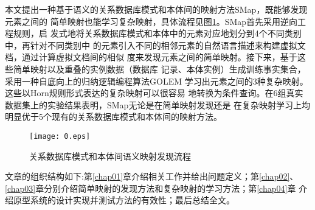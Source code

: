 本文提出一种基于语义的关系数据库模式和本体间的映射方法SMap，既能够发现元素之间的
简单映射也能学习复杂映射，具体流程见图\ref{fig:0}。SMap首先采用逆向工程规则，启
发式地将关系数据库模式和本体中的元素对应地划分到4个不同类别中，再针对不同类别中
的元素引入不同的相邻元素的自然语言描述来构建虚拟文档，通过计算虚拟文档间的相似
度来发现元素之间的简单映射。接下来，基于这些简单映射以及重叠的实例数据（数据库
记录、本体实例）生成训练事实集合，采用一种自底向上的归纳逻辑编程算法GOLEM
\cite{8}学习出元素之间的3种复杂映射。这些以Horn规则形式表达的复杂映射可以很容易
地转换为条件查询。在6组真实数据集上的实验结果表明，SMap无论是在简单映射发现还是
在复杂映射学习上均明显优于5个现有的关系数据库模式和本体间的映射方法。

\begin{figure}[htdp]
\centerline{\texttt{[image: 0.eps]}}
\caption{关系数据库模式和本体间语义映射发现流程}
\label{fig:0}
\end{figure}

文章的组织结构如下:第\ref{chap01}章介绍相关工作并给出问题定义；第\ref{chap02}、
\ref{chap03}章分别介绍简单映射的发现方法和复杂映射的学习方法；第\ref{chap04}章
介绍原型系统的设计实现并测试方法的有效性；最后总结全文。
